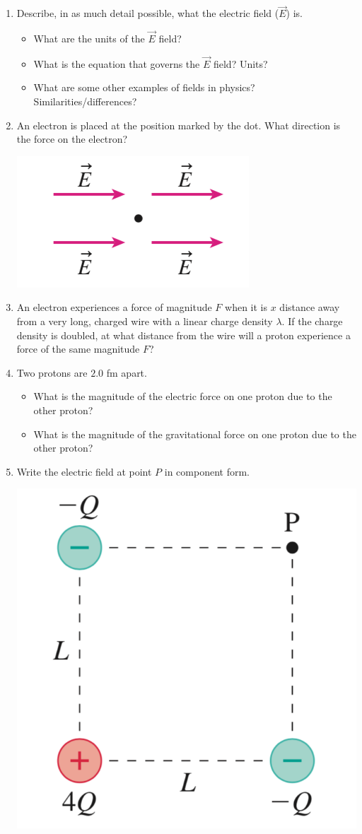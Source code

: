 \documentclass{article}
\begin{document}
\begin{enumerate}[label=(\alph*)]

\item Describe, in as much detail possible, what the electric field ($\vec{E}$) is.
\begin{itemize}
	\item What are the units of the $\vec{E}$ field?
	\item What is the equation that governs the $\vec{E}$ field? Units?
	\item What are some other examples of fields in physics? Similarities/differences? 
\end{itemize}
 

\item An electron is placed at the position marked by the dot. What direction is the force on the electron?



\includegraphics[width=.3\linewidth]{W1_Fig1}


\item An electron experiences a force of magnitude $F$ when it is $x$ distance away from a very long, charged wire with a linear charge density $\lambda$. If the charge density is doubled, at what distance from the wire will a proton experience a force of the same magnitude $F$? 

\item Two protons are $2.0$ fm apart.
\begin{itemize}
	\item What is the magnitude of the electric force on one proton due to the other proton?
	\item What is the magnitude of the gravitational force on one proton due to the other proton?
\end{itemize} 


\item Write the electric field at point $P$ in component form.

\includegraphics[width=.3\linewidth]{W1_Fig2}

\end{enumerate}
\end{document}

